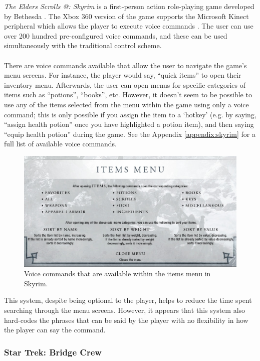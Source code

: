 \documentclass[11pt]{article}
\makeatletter
\newcommand*{\rom}[1]{\expandafter\@slowromancap\romannumeral #1@}
\makeatother
\begin{document}
\textit{The Elders Scrolls \rom{5}: Skyrim} is a first-person action role-playing game developed by Bethesda \cite{RefWorks:23}. The Xbox 360 version of the game supports the Microsoft Kinect peripheral which allows the player to execute voice commands \cite{RefWorks:24}. The user can use over 200 hundred pre-configured voice commands, and these can be used simultaneously with the traditional control scheme.
\\
\\
There are voice commands available that allow the user to navigate the game's menu screens. For instance, the player would say, ``quick items'' to open their inventory menu. Afterwards, the user can open menus for specific categories of items such as ``potions'', ``books'', etc. However, it doesn't seem to be possible to use any of the items selected from the menu within the game using only a voice command; this is only possible if you assign the item to a `hotkey' (e.g. by saying, ``assign health potion'' once you have highlighted a potion item), and then saying ``equip health potion'' during the game. See the Appendix \ref{appendix:skyrim} for a full list of available voice commands.
\begin{center}
\begin{figure}[H]
  \includegraphics[width=\textwidth]{skyrim-item-commands.png}
  \caption{Voice commands that are available within the items menu in Skyrim.}
\end{figure}
\end{center}
This system, despite being optional to the player, helps to reduce the time spent searching through the menu screens. However, it appears that this system also hard-codes the phrases that can be said by the player with no flexibility in how the player can say the command.

\subsubsection{Star Trek: Bridge Crew}
\end{document}
